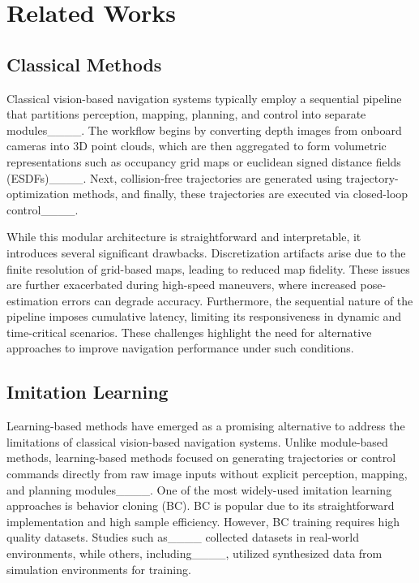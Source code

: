 \section{Related Works}
\label{Related Works}
\subsection{Classical Methods}
Classical vision-based navigation systems typically employ a sequential pipeline that partitions perception, mapping, planning, and control into separate modules____. The workflow begins by converting depth images from onboard cameras into 3D point clouds, which are then aggregated to form volumetric representations such as occupancy grid maps or euclidean signed distance fields (ESDFs)____. Next, collision-free trajectories are generated using trajectory-optimization methods, and finally, these trajectories are executed via closed-loop control____. 

While this modular architecture is straightforward and interpretable, it introduces several significant drawbacks. Discretization artifacts arise due to the finite resolution of grid-based maps, leading to reduced map fidelity. These issues are further exacerbated during high-speed maneuvers, where increased pose-estimation errors can degrade accuracy. Furthermore, the sequential nature of the pipeline imposes cumulative latency, limiting its responsiveness in dynamic and time-critical scenarios. These challenges highlight the need for alternative approaches to improve navigation performance under such conditions.

\subsection{Imitation Learning}
Learning-based methods have emerged as a promising alternative to address the limitations of classical vision-based navigation systems. Unlike module-based methods, learning-based methods focused on generating trajectories or control commands directly from raw image inputs without explicit perception, mapping, and planning modules____. One of the most widely-used imitation learning approaches is behavior cloning (BC). BC is popular due to its straightforward implementation and high sample efficiency. However, BC training requires high quality datasets. Studies such as____ collected datasets in real-world environments, while others, including____, utilized synthesized data from simulation environments for training.

